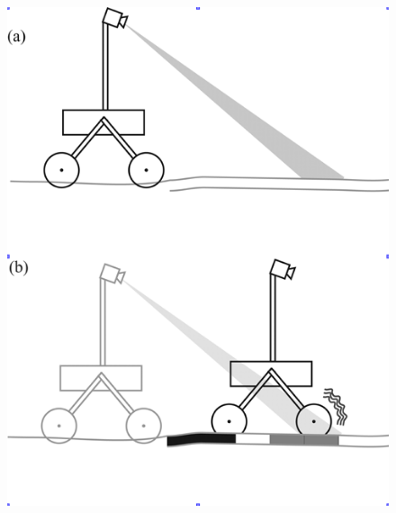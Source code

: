 \begin{frame}
\begin{columns}[c]
            \begin{column}{0.3\textwidth}
                \begin{figure}                 
                    \includegraphics[width=\textwidth,height=0.6\textheight]{./media/completeSensors.png}
                \end{figure}
            \end{column}            
        \end{columns}              
    \end{frame}
    
